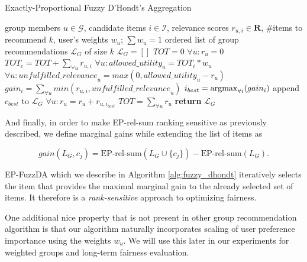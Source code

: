 \begin{algorithm}\label{alg:fuzzy_dhondt}
    \caption{Exactly-Proportional Fuzzy D'Hondt's Aggregation}
    \begin{algorithmic}[1]
         group members $u \in \mathcal{G}$, candidate items $i \in \mathcal{I}$, relevance scores $r_{u,i} \in \mathbf{R}$, \#items to recommend $k$, user's weights $w_u$; $\sum w_u = 1$ 
         ordered list of group recommendations $\mathcal{L}_G$ of size $k$
        \vspace{1mm}
        \State $\mathcal{L}_G = []$ 
        \State $TOT = 0$
        \State $\forall u: r_u = 0$
        \vspace{1mm}
                \State $TOT_c = TOT + \sum_{\forall u} r_{u,i}$
                \State $\forall u: \mathit{allowed\_utility}_u = TOT_i * w_u$
                \State $\forall u: \mathit{unfulfilled\_relevance}_u = max(0, \mathit{allowed\_utility}_u - r_u)$
                \State $gain_i = \sum_{\forall u} min(r_{u,i}, \mathit{unfulfilled\_relevance}_u)$
            \EndFor
            \State $i_{best} = \operatorname*{argmax}_{\forall i}(gain_i)$
            \State append $c_{best}$ to $\mathcal{L}_G$
            \State  $\forall u: r_u = r_u + r_{u,i_{best}}$
            \State $TOT = \sum_{\forall u} r_u$
        \EndFor
        \State \textbf{return} $\mathcal{L}_G$ 
    \end{algorithmic}
\end{algorithm}

And finally, in order to make EP-rel-sum ranking sensitive as previously described, we define marginal gains while extending the list of items as

\begin{equation}
    gain(L_G, c_j) = \textrm{EP-rel-sum}(L_G \cup \{c_j\}) - \textrm{EP-rel-sum}(L_G).
\end{equation}

EP-FuzzDA which we describe in Algorithm \ref{alg:fuzzy_dhondt} iteratively selects the item that provides the maximal marginal gain to the already selected set of items. It therefore is a \textit{rank-sensitive} approach to optimizing fairness.

One additional nice property that is not present in other group recommendation algorithm is that our algorithm naturally incorporates scaling of user preference importance using the weights $w_u$. We will use this later in our experiments for weighted groups and long-term fairness evaluation.
